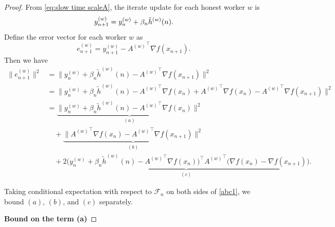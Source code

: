 \documentclass[10pt,a4paper]{amsart}
\begin{document}
\begin{proof}
 From \eqref{eq:slow time scaleA}, the iterate update for each honest worker $w$ is  
\[
    y_{n+1}^{(w)} = y_n^{(w)} + \beta_n \Tilde{h}^{(w)}(n).
\]  
Define the error vector for each worker $w$ as  
\[
    e_{n+1}^{(w)} = y_{n+1}^{(w)} - {A^{(w)}}^\top \nabla f(x_{n+1}).
\]  
Then we have  
\begin{equation}
\begin{split}
\|e_{n+1}^{(w)}\|^2
&= \Big\|
y_n^{(w)} + \beta_n \widetilde{h}^{(w)}(n) - {A^{(w)}}^\top \nabla f(x_{n+1})
\Big\|^2 \\
&= \Big\|
y_n^{(w)} + \beta_n \widetilde{h}^{(w)}(n) - {A^{(w)}}^\top \nabla f(x_n)
+ {A^{(w)}}^\top \nabla f(x_n) - {A^{(w)}}^\top \nabla f(x_{n+1})
\Big\|^2 \\
&=
\underbrace{\big\|
y_n^{(w)} + \beta_n \widetilde{h}^{(w)}(n) - {A^{(w)}}^\top \nabla f(x_n)
\big\|^2}_{(a)} \\
&\quad +
\underbrace{\big\|
{A^{(w)}}^\top \nabla f(x_n) - {A^{(w)}}^\top \nabla f(x_{n+1})
\big\|^2}_{(b)} \\
&\quad +
\underbrace{2 \Big(
y_n^{(w)} + \beta_n \widetilde{h}^{(w)}(n) - {A^{(w)}}^\top \nabla f(x_n)
\Big)^\top 
{A^{(w)}}^\top\big(
\nabla f(x_n) - \nabla f(x_{n+1})
\big)}_{(c)}.
\end{split}
\label{abc1}
\end{equation}

Taking conditional expectation with respect to $\mathcal{F}_n$ on both sides of \eqref{abc1}, we bound $(a)$, $(b)$, and $(c)$ separately.

\textbf{Bound on the term (a)}


\end{proof}
\end{document}
